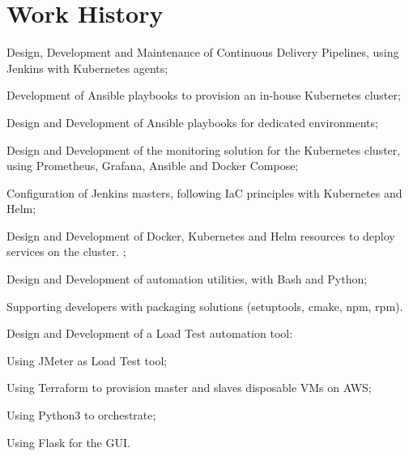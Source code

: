 \documentclass[]{deedy-resume-openfont}
\begin{document}
\begin{minipage}[t]{0.65\textwidth}

\section{Work History}
\vspace{\topsep} %
\begin{tightemize}
	\item Design, Development and Maintenance of Continuous Delivery Pipelines, using Jenkins with Kubernetes agents;
	\item Development of Ansible playbooks to provision an in-house Kubernetes cluster;
	\item Design and Development of Ansible playbooks for dedicated environments;
	\item Design and Development of the monitoring solution for the Kubernetes cluster, using Prometheus, Grafana, Ansible and Docker Compose;
	\item Configuration of Jenkins masters, following IaC principles with Kubernetes and Helm;
	\item Design and Development of Docker, Kubernetes and Helm resources to deploy services on the cluster.
	;
	\item Design and Development of automation utilities, with Bash and Python;
	\item Supporting developers with packaging solutions (setuptools, cmake, npm, rpm).
\end{tightemize}
\sectionsep

\vspace{\topsep} %
Design and Development of a Load Test automation tool:\\
\begin{tightemize}
	\item Using JMeter as Load Test tool;
	\item Using Terraform to provision master and slaves disposable VMs on AWS;
	\item Using Python3 to orchestrate;
	\item Using Flask for the GUI.
\end{tightemize}
\sectionsep


\end{minipage}
\end{document}
